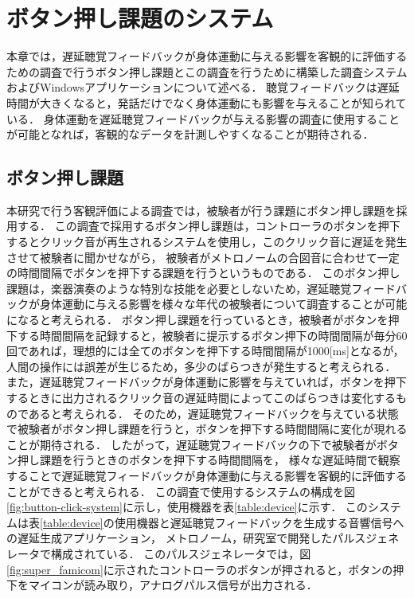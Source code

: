 \chapter{ボタン押し課題のシステム}
本章では，遅延聴覚フィードバックが身体運動に与える影響を客観的に評価するための調査で行うボタン押し課題とこの調査を行うために構築した調査システムおよびWindowsアプリケーションについて述べる．
聴覚フィードバックは遅延時間が大きくなると，発話だけでなく身体運動にも影響を与えることが知られている\cite{timing-music}\cite{shimada-DAF}．
身体運動を遅延聴覚フィードバックが与える影響の調査に使用することが可能となれば，客観的なデータを計測しやすくなることが期待される．

\section{ボタン押し課題}
本研究で行う客観評価による調査では，被験者が行う課題にボタン押し課題を採用する．
この調査で採用するボタン押し課題は，コントローラのボタンを押下するとクリック音が再生されるシステムを使用し，このクリック音に遅延を発生させて被験者に聞かせながら，
被験者がメトロノームの合図音に合わせて一定の時間間隔でボタンを押下する課題を行うというものである．
このボタン押し課題は，楽器演奏のような特別な技能を必要としないため，遅延聴覚フィードバックが身体運動に与える影響を様々な年代の被験者について調査することが可能になると考えられる．
ボタン押し課題を行っているとき，被験者がボタンを押下する時間間隔を記録すると，被験者に提示するボタン押下の時間間隔が毎分60回であれば，理想的には全てのボタンを押下する時間間隔が1000[ms]となるが，
人間の操作には誤差が生じるため，多少のばらつきが発生すると考えられる．
また，遅延聴覚フィードバックが身体運動に影響を与えていれば，ボタンを押下するときに出力されるクリック音の遅延時間によってこのばらつきは変化するものであると考えられる．
そのため，遅延聴覚フィードバックを与えている状態で被験者がボタン押し課題を行うと，ボタンを押下する時間間隔に変化が現れることが期待される．
したがって，遅延聴覚フィードバックの下で被験者がボタン押し課題を行うときのボタンを押下する時間間隔を，
様々な遅延時間で観察することで遅延聴覚フィードバックが身体運動に与える影響を客観的に評価することができると考えられる．
この調査で使用するシステムの構成を図\ref{fig:button-click-system}に示し，使用機器を表\ref{table:device}に示す．
このシステムは表\ref{table:device}の使用機器と遅延聴覚フィードバックを生成する音響信号への遅延生成アプリケーション，
メトロノーム，研究室で開発したパルスジェネレータで構成されている．
このパルスジェネレータでは，図\ref{fig:super_famicom}に示されたコントローラのボタンが押されると，ボタンの押下をマイコンが読み取り，アナログパルス信号が出力される．
